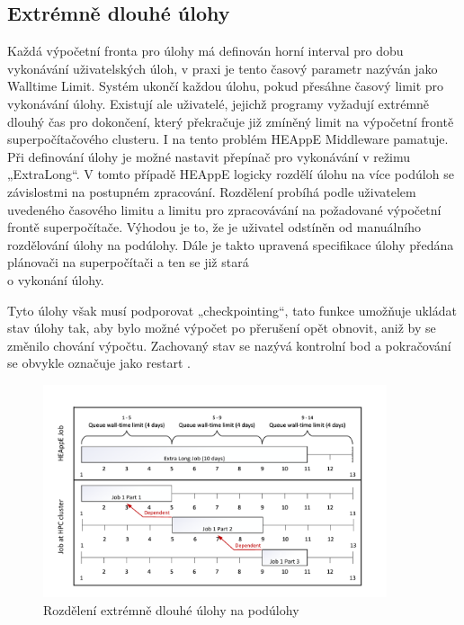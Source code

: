\subsection{Extrémně dlouhé úlohy}
Každá výpočetní fronta pro úlohy má definován horní interval pro dobu vykonávání uživatelských úloh, v praxi je tento časový parametr nazýván jako Walltime Limit. Systém ukončí každou úlohu, pokud přesáhne časový limit pro vykonávání úlohy. Existují ale uživatelé, jejichž programy vyžadují extrémně dlouhý čas pro dokončení, který překračuje již zmíněný limit na výpočetní frontě superpočítačového clusteru. I na tento problém HEAppE Middleware pamatuje. Při definování úlohy je možné nastavit přepínač pro vykonávání v režimu „ExtraLong“. V tomto případě HEAppE logicky rozdělí úlohu na více podúloh se závislostmi na postupném zpracování. Rozdělení probíhá podle uživatelem uvedeného časového limitu a limitu pro zpracovávání na požadované výpočetní frontě superpočítače. Výhodou je to, že je uživatel odstíněn od manuálního rozdělování úlohy na podúlohy. Dále je takto upravená specifikace úlohy předána plánovači na superpočítači a ten se již stará \\o vykonání úlohy. 

Tyto úlohy však musí podporovat „checkpointing“, tato funkce umožňuje ukládat stav úlohy tak, aby bylo možné výpočet po přerušení opět obnovit, aniž by se změnilo chování výpočtu. Zachovaný stav se nazývá kontrolní bod a pokračování se obvykle označuje jako restart \cite{Padua2011}.

\hfill \break
\begin{figure}[h]
	\centering
	\includegraphics[width=0.9\textwidth]{Figures/ExtraLong.pdf}
	\caption{Rozdělení extrémně dlouhé úlohy na podúlohy}
	\label{fig:rozdeleni-extra-long}
\end{figure}